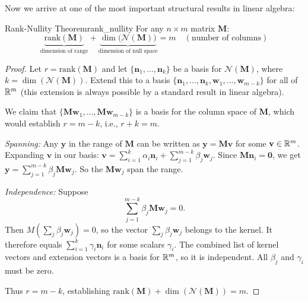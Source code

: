 Now we arrive at one of the most important structural results in linear algebra:

\begin{theorem}{Rank-Nullity Theorem}{rank_nullity}
For any $n \times m$ matrix $\mathbf{M}$:
\begin{equation}
    \underbrace{\text{rank}(\mathbf{M})}_{\text{dimension of range}} + \underbrace{\dim\bigl(\mathcal{N}(\mathbf{M})\bigr)}_{\text{dimension of null space}} = m \quad (\text{number of columns})
\end{equation}
\end{theorem}

\begin{proof}
Let $r = \text{rank}(\mathbf{M})$ and let $\{\mathbf{n}_1, \ldots, \mathbf{n}_k\}$ be a basis for $\mathcal{N}(\mathbf{M})$, where $k = \dim(\mathcal{N}(\mathbf{M}))$. Extend this to a basis $\{\mathbf{n}_1, \ldots, \mathbf{n}_k, \mathbf{w}_1, \ldots, \mathbf{w}_{m-k}\}$ for all of $\mathbb{R}^m$ (this extension is always possible by a standard result in linear algebra).

We claim that $\{\mathbf{M}\mathbf{w}_1, \ldots, \mathbf{M}\mathbf{w}_{m-k}\}$ is a basis for the column space of $\mathbf{M}$, which would establish $r = m - k$, i.e., $r + k = m$.

\emph{Spanning:} Any $\mathbf{y}$ in the range of $\mathbf{M}$ can be written as $\mathbf{y} = \mathbf{M}\mathbf{v}$ for some $\mathbf{v} \in \mathbb{R}^m$. Expanding $\mathbf{v}$ in our basis: $\mathbf{v} = \sum_{i=1}^k \alpha_i \mathbf{n}_i + \sum_{j=1}^{m-k} \beta_j \mathbf{w}_j$. Since $\mathbf{M}\mathbf{n}_i = \mathbf{0}$, we get $\mathbf{y} = \sum_{j=1}^{m-k} \beta_j \mathbf{M}\mathbf{w}_j$. So the $\mathbf{M}\mathbf{w}_j$ span the range.

\emph{Independence:} Suppose
\[
\sum_{j=1}^{m-k}\beta_j\mathbf M\mathbf w_j=0.
\]
Then $M(\sum_j\beta_j\mathbf w_j)=0$, so the vector $\sum_j\beta_j\mathbf w_j$ belongs to the kernel. It therefore equals $\sum_{i=1}^k\gamma_i\mathbf n_i$ for some scalars $\gamma_i$. The combined list of kernel vectors and extension vectors is a basis for $\mathbb{R}^m$, so it is independent. All $\beta_j$ and $\gamma_i$ must be zero.

Thus $r = m - k$, establishing $\text{rank}(\mathbf{M}) + \dim(\mathcal{N}(\mathbf{M})) = m$.
\end{proof}

